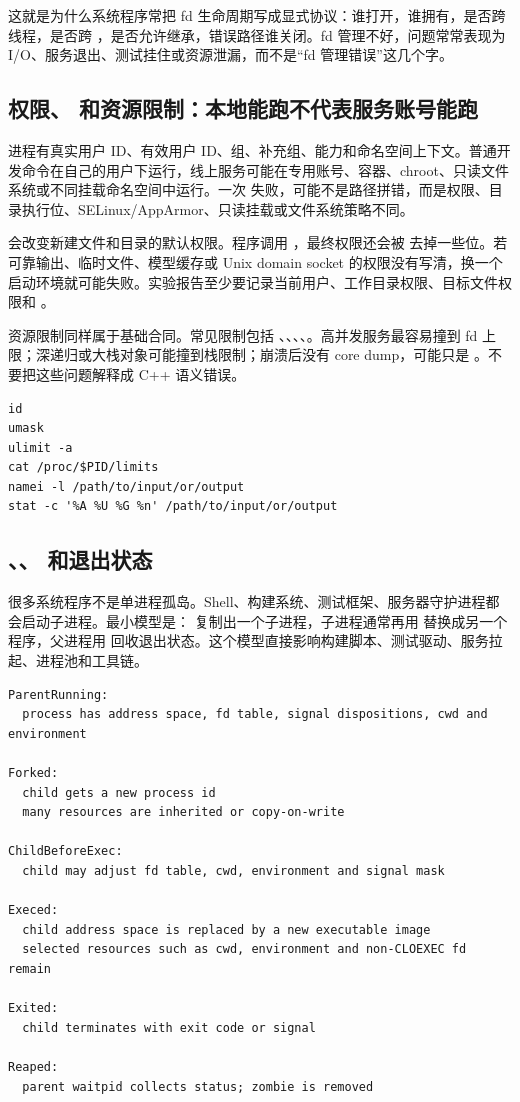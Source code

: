 这就是为什么系统程序常把 fd 生命周期写成显式协议：谁打开，谁拥有，是否跨线程，是否跨 ，是否允许继承，错误路径谁关闭。fd 管理不好，问题常常表现为 I/O、服务退出、测试挂住或资源泄漏，而不是“fd 管理错误”这几个字。

\subsection{权限、 和资源限制：本地能跑不代表服务账号能跑}

进程有真实用户 ID、有效用户 ID、组、补充组、能力和命名空间上下文。普通开发命令在自己的用户下运行，线上服务可能在专用账号、容器、chroot、只读文件系统或不同挂载命名空间中运行。一次  失败，可能不是路径拼错，而是权限、目录执行位、SELinux/AppArmor、只读挂载或文件系统策略不同。

 会改变新建文件和目录的默认权限。程序调用 ，最终权限还会被  去掉一些位。若可靠输出、临时文件、模型缓存或 Unix domain socket 的权限没有写清，换一个启动环境就可能失败。实验报告至少要记录当前用户、工作目录权限、目标文件权限和 。

资源限制同样属于基础合同。常见限制包括 、、、、。高并发服务最容易撞到 fd 上限；深递归或大栈对象可能撞到栈限制；崩溃后没有 core dump，可能只是 。不要把这些问题解释成 C++ 语义错误。

\begin{lstlisting}[numbers=none,caption={权限和资源限制证据}]
id
umask
ulimit -a
cat /proc/$PID/limits
namei -l /path/to/input/or/output
stat -c '%A %U %G %n' /path/to/input/or/output
\end{lstlisting}

\subsection{、、 和退出状态}

很多系统程序不是单进程孤岛。Shell、构建系统、测试框架、服务器守护进程都会启动子进程。最小模型是： 复制出一个子进程，子进程通常再用  替换成另一个程序，父进程用  回收退出状态。这个模型直接影响构建脚本、测试驱动、服务拉起、进程池和工具链。

\begin{lstlisting}[numbers=none,caption={fork/exec/wait 的状态机}]
ParentRunning:
  process has address space, fd table, signal dispositions, cwd and environment

Forked:
  child gets a new process id
  many resources are inherited or copy-on-write

ChildBeforeExec:
  child may adjust fd table, cwd, environment and signal mask

Execed:
  child address space is replaced by a new executable image
  selected resources such as cwd, environment and non-CLOEXEC fd remain

Exited:
  child terminates with exit code or signal

Reaped:
  parent waitpid collects status; zombie is removed
\end{lstlisting}

